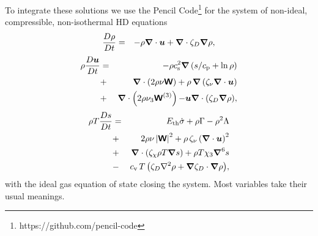 \documentclass[fleqn,usenatbib]{mnras}
\newcommand\ESK{E_{\rm kin}}
\newcommand\EST{E_{\rm th}}
\newcommand{\vect}[1]{{{\mbox{\boldmath $#1$}}}}%
\begin{document}
 To integrate these solutions we use the Pencil
 Code\footnote{https://github.com/pencil-code} \citep{Pencil-JOSS} for
 the system of non-ideal, compressible, non-isothermal HD equations
  \begin{eqnarray}
  \label{eq:mass}
    \frac{D\rho}{Dt} &=& 
    -\rho \vect\nabla \cdot \vect{u}
    +\vect\nabla \cdot\zeta_D\vect\nabla\rho,
  \end{eqnarray}
  \begin{eqnarray}
  \label{eq:mom}
    \rho\frac{D\vect{u}}{Dt} &=& 
    -\rho c_{\rm s}^2\vect\nabla\left({s}/{c_{\rm p}}+\ln\rho\right)
    \nonumber\\
    &+&\vect\nabla\cdot \left(2\rho\nu{\mathbfss W}\right)
    +\rho\,\vect\nabla\left(\zeta_{\nu}\vect\nabla \cdot \vect{u} \right)
    \nonumber\\
    &+&\vect\nabla\cdot \left(2\rho\nu_3{\mathbfss W}^{(3)}\right)
  {-\vect u\vect{\nabla}\cdot\left(\zeta_D\vect{\nabla}\rho\right)},
  \end{eqnarray}
  \begin{eqnarray}
  \label{eq:ent}
    \rho T\frac{D s}{Dt} &=&
     \EST\dot\sigma +\rho\Gamma
    -\rho^2\Lambda %
    \nonumber\\
    &+&2 \rho \nu\left|{\mathbfss W}\right|^{2}
    +\rho\,\zeta_{\nu}\left(\vect\nabla \cdot \vect{u} \right)^2
    \nonumber\\
    &+&\vect\nabla\cdot\left(\zeta_\chi\rho T\vect\nabla s\right)
    +\rho T\chi_3\vect\nabla^6 s
    \nonumber\\
    &-& {c_{\rm{v}}\,T \left(
    \zeta_D\nabla^2\rho + \vect\nabla\zeta_D\cdot\vect\nabla\rho\right)},
  \end{eqnarray}
 with the ideal gas equation of state closing the system.
 Most variables take their usual meanings.
\end{document}
